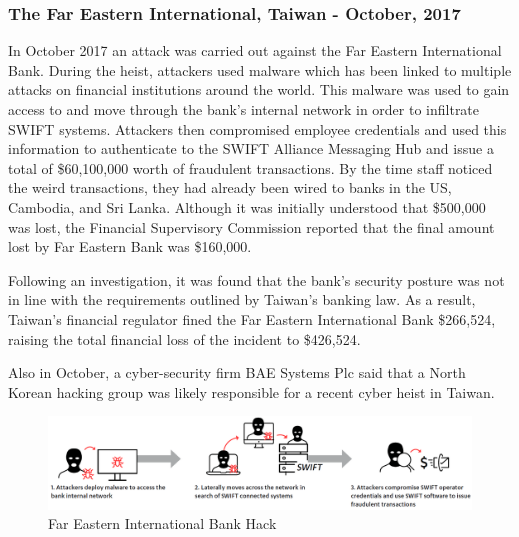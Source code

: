 \documentclass[12pt]{article}
\begin{document}
    \subsubsection{The Far Eastern International, Taiwan - October, 2017}
        In October 2017 an attack was carried out against the Far Eastern International Bank. During the heist, attackers used malware which has been linked to multiple attacks on financial institutions around the world. This malware was used to gain access to and move through the bank’s internal network in order to infiltrate SWIFT systems. Attackers then compromised employee credentials and used this information to authenticate to the SWIFT Alliance Messaging Hub and issue a total of \$60,100,000 worth of fraudulent transactions. By the time staff noticed the weird transactions, they had already been wired to banks in the US, Cambodia, and Sri Lanka. Although it was initially understood that \$500,000 was lost, the Financial Supervisory Commission reported that the final amount lost by Far Eastern Bank was \$160,000.\cite{thomsonHackersNick60m2017}
        
        Following an investigation, it was found that the bank’s security posture was not in line with the requirements outlined by Taiwan’s banking law. As a result, Taiwan’s financial regulator fined the Far Eastern International Bank \$266,524, raising the total financial loss of the incident to \$426,524.\cite{TaiwanFarEastern2017}
        
        Also in October, a cyber-security firm BAE Systems Plc said that a North Korean hacking group was likely responsible for a recent cyber heist in Taiwan.\cite{intelligenceBAESystemsThreat}
        
        \begin{figure}[H]
        \centering
        \includegraphics[width=\textwidth]{figures/fareast.png}
        \caption{Far Eastern International Bank Hack}
        \label{fig:FarEastHacks}
        \end{figure}
        
\end{document}
